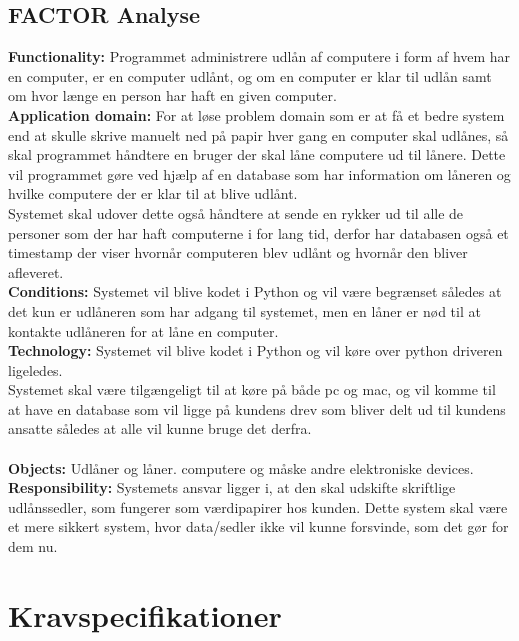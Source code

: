 \documentclass[a4paper]{article}
\begin{document}
\subsection{FACTOR Analyse}
\textbf{Functionality:} Programmet administrere udlån af computere i form af hvem har en computer, er en computer udlånt, og om en computer er klar til udlån samt om hvor længe en person har haft en given computer.\\
\textbf{Application domain:} For at løse problem domain som er at få et bedre system end at skulle skrive manuelt ned på papir hver gang en computer skal udlånes, så skal programmet håndtere en bruger der skal låne computere ud til lånere. Dette vil programmet gøre ved hjælp af en database som har information om låneren og hvilke computere der er klar til at blive udlånt.\\
Systemet skal udover dette også håndtere at sende en rykker ud til alle de personer som der har haft computerne i for lang tid, derfor har databasen også et timestamp der viser hvornår computeren blev udlånt og hvornår den bliver afleveret.\\
\textbf{Conditions:} Systemet vil blive kodet i Python og vil være begrænset således at det kun er udlåneren som har adgang til systemet, men en låner er nød til at kontakte udlåneren for at låne en computer.\\
\textbf{Technology:} Systemet vil blive kodet i Python og vil køre over python driveren ligeledes.\\
Systemet skal være tilgængeligt til at køre på både pc og mac, og vil komme til at have en database som vil ligge på kundens drev som bliver delt ud til kundens ansatte således at alle vil kunne bruge det derfra.\\
\\
\textbf{Objects:} Udlåner og låner. computere og måske andre elektroniske devices.\\
\textbf{Responsibility:} Systemets ansvar ligger i, at den skal udskifte skriftlige udlånssedler, som fungerer som værdipapirer hos kunden. Dette system skal være et mere sikkert system, hvor data/sedler ikke vil kunne forsvinde, som det gør for dem nu.
\section{Kravspecifikationer}
\end{document}
